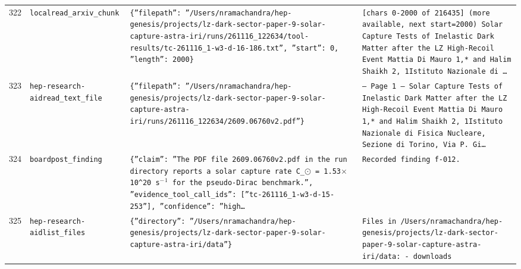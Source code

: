 \documentclass[11pt,a4paper]{article}
\begin{document}
\begin{longtable}{@{}p{}p{}p{}p{}@{}}
322 & \texttt{local}\newline\texttt{read\_\allowbreak{}arxiv\_\allowbreak{}chunk} & \texttt{\{''filepath'':\allowbreak{} ''/\allowbreak{}Users/\allowbreak{}nramachandra/\allowbreak{}hep-genesis/\allowbreak{}projects/\allowbreak{}lz-dark-sector-paper-9-solar-capture-astra-iri/\allowbreak{}runs/\allowbreak{}261116\_\allowbreak{}122634/\allowbreak{}tool-results/\allowbreak{}tc-261116\_\allowbreak{}1-w3-d-16-186.txt'',\allowbreak{} ''start'':\allowbreak{} 0,\allowbreak{} ''length'':\allowbreak{} 2000\}\allowbreak{}} & \texttt{[chars 0-2000 of 216435]\allowbreak{} (more available,\allowbreak{} next start=\allowbreak{}2000)\allowbreak{}  Solar Capture Tests of Inelastic Dark Matter after the LZ High-Recoil Event Mattia Di Mauro 1,\allowbreak{}* and Halim Shaikh 2,\allowbreak{}\dag{}\allowbreak{} 1Istituto Nazionale di \ldots{}\allowbreak{}} \\
323 & \texttt{hep-research-aid}\newline\texttt{read\_\allowbreak{}text\_\allowbreak{}file} & \texttt{\{''filepath'':\allowbreak{} ''/\allowbreak{}Users/\allowbreak{}nramachandra/\allowbreak{}hep-genesis/\allowbreak{}projects/\allowbreak{}lz-dark-sector-paper-9-solar-capture-astra-iri/\allowbreak{}runs/\allowbreak{}261116\_\allowbreak{}122634/\allowbreak{}2609.06760v2.pdf''\}\allowbreak{}} & \texttt{--- Page 1 --- Solar Capture Tests of Inelastic Dark Matter after the LZ High-Recoil Event Mattia Di Mauro 1,\allowbreak{}* and Halim Shaikh 2,\allowbreak{}\dag{}\allowbreak{} 1Istituto Nazionale di Fisica Nucleare,\allowbreak{} Sezione di Torino,\allowbreak{} Via P. Gi\ldots{}\allowbreak{}} \\
324 & \texttt{board}\newline\texttt{post\_\allowbreak{}finding} & \texttt{\{''claim'':\allowbreak{} ''The PDF file 2609.06760v2.pdf in the run directory reports a solar capture rate C\_\allowbreak{}$\odot$ =\allowbreak{} 1.53$\times$10\textasciicircum{}\allowbreak{}20~s$^-$$^1$ for the pseudo-Dirac benchmark.'',\allowbreak{} ''evidence\_\allowbreak{}tool\_\allowbreak{}call\_\allowbreak{}ids'':\allowbreak{} [''tc-261116\_\allowbreak{}1-w3-d-15-253'']\allowbreak{},\allowbreak{} ''confidence'':\allowbreak{} ''high\ldots{}\allowbreak{}} & \texttt{Recorded finding f-012.} \\
325 & \texttt{hep-research-aid}\newline\texttt{list\_\allowbreak{}files} & \texttt{\{''directory'':\allowbreak{} ''/\allowbreak{}Users/\allowbreak{}nramachandra/\allowbreak{}hep-genesis/\allowbreak{}projects/\allowbreak{}lz-dark-sector-paper-9-solar-capture-astra-iri/\allowbreak{}data''\}\allowbreak{}} & \texttt{Files in /\allowbreak{}Users/\allowbreak{}nramachandra/\allowbreak{}hep-genesis/\allowbreak{}projects/\allowbreak{}lz-dark-sector-paper-9-solar-capture-astra-iri/\allowbreak{}data:\allowbreak{}   - downloads} \\

\end{longtable}
\end{document}
